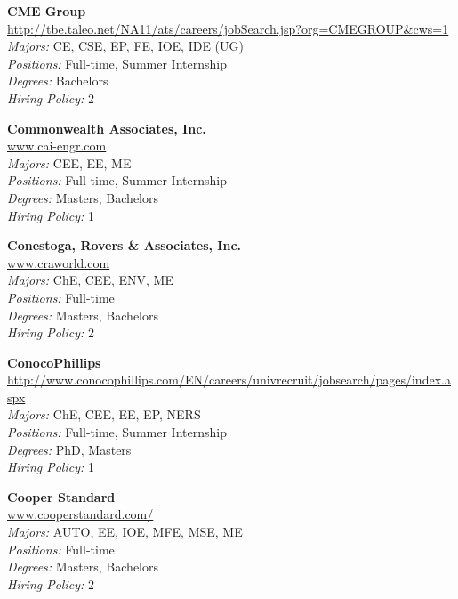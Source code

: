 \documentclass[twoside]{article}
\begin{document}
\begin{center}
\begin{multicols}{3}
\begin{minipage}{.9\columnwidth}{\Large\bf CME Group }\\
	\url{http://tbe.taleo.net/NA11/ats/careers/jobSearch.jsp?org=CMEGROUP&cws=1}\\
	\emph{Majors:} CE, CSE, EP, FE, IOE, IDE (UG)\\
	\emph{Positions:} Full-time, Summer Internship\\
	\emph{Degrees:} Bachelors\\
	\emph{Hiring Policy:} 2\\
\end{minipage}
 
\begin{minipage}{.9\columnwidth}{\Large\bf Commonwealth Associates, Inc. }\\
	\url{www.cai-engr.com}\\
	\emph{Majors:} CEE, EE, ME\\
	\emph{Positions:} Full-time, Summer Internship\\
	\emph{Degrees:} Masters, Bachelors\\
	\emph{Hiring Policy:} 1\\
\end{minipage}
 
\begin{minipage}{.9\columnwidth}{\Large\bf Conestoga, Rovers \& Associates, Inc. }\\
	\url{www.craworld.com}\\
	\emph{Majors:} ChE, CEE, ENV, ME\\
	\emph{Positions:} Full-time\\
	\emph{Degrees:} Masters, Bachelors\\
	\emph{Hiring Policy:} 2\\
\end{minipage}
 
\begin{minipage}{.9\columnwidth}{\Large\bf ConocoPhillips }\\
	\url{http://www.conocophillips.com/EN/careers/univrecruit/jobsearch/pages/index.aspx}\\
	\emph{Majors:} ChE, CEE, EE, EP, NERS\\
	\emph{Positions:} Full-time, Summer Internship\\
	\emph{Degrees:} PhD, Masters\\
	\emph{Hiring Policy:} 1\\
\end{minipage}
 
\begin{minipage}{.9\columnwidth}{\Large\bf Cooper Standard }\\
	\url{www.cooperstandard.com/}\\
	\emph{Majors:} AUTO, EE, IOE, MFE, MSE, ME\\
	\emph{Positions:} Full-time\\
	\emph{Degrees:} Masters, Bachelors\\
	\emph{Hiring Policy:} 2\\
\end{minipage}
 

\end{multicols}
\end{center}
\end{document}
